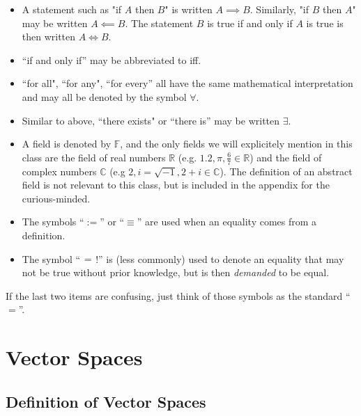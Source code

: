 \documentclass[11pt, reqno]{amsart}
\theoremstyle{definition} %
\newcommand{\R}{\mathbb{R}}
\newcommand{\C}{\mathbb{C}}
\newcommand{\F}{\mathbb{F}}
\begin{document}
\begin{itemize}
    \begin{equation}
        \begin{gathered}
            +:\R\times \R\to \R\\
            (x,y)\mapsto x+y
        \end{gathered}
    \end{equation}
    \item A statement such as "if $A$ then $B$" is written $A\implies B$. Similarly, "if $B$ then $A$" may be written $A\impliedby B$. The statement $B$ is true if and only if $A$ is true is then written $A\iff B$.
    \item ``if and only if'' may be abbreviated to iff.
    \item ``for all", ``for any", ``for every'' all have the same mathematical interpretation and may all be denoted by the symbol $\forall$.
    \item Similar to above, ``there exists" or ``there is'' may be written $\exists$.
    \item A field is denoted by $\F$, and the only fields we will explicitely mention in this class are the field of real numbers $\R$ (e.g. $1.2,\pi, \frac67\in\R$) and the field of complex numbers $\C$ (e.g $2, i=\sqrt{-1}, 2+i\in\C$). The definition of an abstract field is not relevant to this class, but is included in the appendix for the curious-minded.
    \item The symbols ``$:=$'' or ``$\equiv$'' are used when an equality comes from a definition.
    \item The symbol ``$\substack{=}{!}$'' is (less commonly) used to denote an equality that may not be true without prior knowledge, but is then \emph{demanded} to be equal. 
\end{itemize}
If the last two items are confusing, just think of those symbols as the standard ``$=$''.

\newpage

\section{Vector Spaces}

\subsection{Definition of Vector Spaces}
\end{document}
